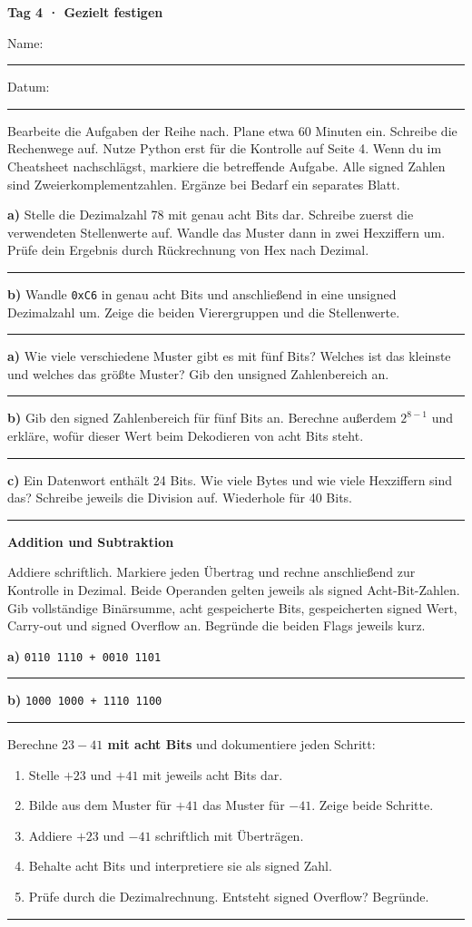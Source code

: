 \documentclass[10pt,a4paper]{article}
\newcommand{\titlepagepart}[2]{\vspace*{-4mm}{\sffamily\small #1}\par{\sffamily\LARGE\bfseries #2}\par\vspace{2mm}}
\newcommand{\block}[1]{\par\vspace{2mm}{\sffamily\large\bfseries #1}\par}
\newcommand{\code}[1]{\texttt{#1}}
\newcommand{\antwort}[1]{\par\vspace{#1}\hrule\vspace{3mm}}
\begin{document}
\titlepagepart{01 / STELLENWERTE · CA. 12 MINUTEN}{Tag 4 · Gezielt festigen}
Name: \rule{65mm}{0.3pt}\hfill Datum: \rule{30mm}{0.3pt}

Bearbeite die Aufgaben der Reihe nach. Plane etwa 60 Minuten ein. Schreibe die
Rechenwege auf. Nutze Python erst für die Kontrolle auf Seite 4. Wenn du im
Cheatsheet nachschlägst, markiere die betreffende Aufgabe. Alle signed Zahlen
sind Zweierkomplementzahlen. Ergänze bei Bedarf ein separates Blatt.

\block{1. Genau umrechnen}
\textbf{a)} Stelle die Dezimalzahl 78 mit genau acht Bits dar. Schreibe zuerst
die verwendeten Stellenwerte auf. Wandle das Muster dann in zwei Hexziffern um.
Prüfe dein Ergebnis durch Rückrechnung von Hex nach Dezimal.
\antwort{27mm}
\textbf{b)} Wandle \code{0xC6} in genau acht Bits und anschließend in eine
unsigned Dezimalzahl um. Zeige die beiden Vierergruppen und die Stellenwerte.
\antwort{24mm}

\block{2. Bitbreite ist nicht der Zahlenwert}
\textbf{a)} Wie viele verschiedene Muster gibt es mit fünf Bits? Welches ist
das kleinste und welches das größte Muster? Gib den unsigned Zahlenbereich an.
\antwort{23mm}
\textbf{b)} Gib den signed Zahlenbereich für fünf Bits an. Berechne außerdem
$2^{8-1}$ und erkläre, wofür dieser Wert beim Dekodieren von acht Bits steht.
\antwort{21mm}
\textbf{c)} Ein Datenwort enthält 24 Bits. Wie viele Bytes und wie viele
Hexziffern sind das? Schreibe jeweils die Division auf. Wiederhole für 40 Bits.
\antwort{24mm}

\newpage
\titlepagepart{02 / SCHRIFTLICH RECHNEN · CA. 20 MINUTEN}{Addition und Subtraktion}
\block{3. Überträge sichtbar machen}
Addiere schriftlich. Markiere jeden Übertrag und rechne anschließend zur
Kontrolle in Dezimal. Beide Operanden gelten jeweils als signed Acht-Bit-Zahlen.
Gib vollständige Binärsumme, acht gespeicherte Bits, gespeicherten signed Wert,
Carry-out und signed Overflow an. Begründe die beiden Flags jeweils kurz.

\textbf{a)} \code{0110 1110 + 0010 1101}
\antwort{40mm}
\textbf{b)} \code{1000 1000 + 1110 1100}
\antwort{40mm}

\block{4. Subtraktion als Addition}
Berechne \textbf{$23-41$ mit acht Bits} und dokumentiere jeden Schritt:
\begin{enumerate}
\item Stelle $+23$ und $+41$ mit jeweils acht Bits dar.
\item Bilde aus dem Muster für $+41$ das Muster für $-41$. Zeige beide Schritte.
\item Addiere $+23$ und $-41$ schriftlich mit Überträgen.
\item Behalte acht Bits und interpretiere sie als signed Zahl.
\item Prüfe durch die Dezimalrechnung. Entsteht signed Overflow? Begründe.
\end{enumerate}
\antwort{43mm}
\end{document}
